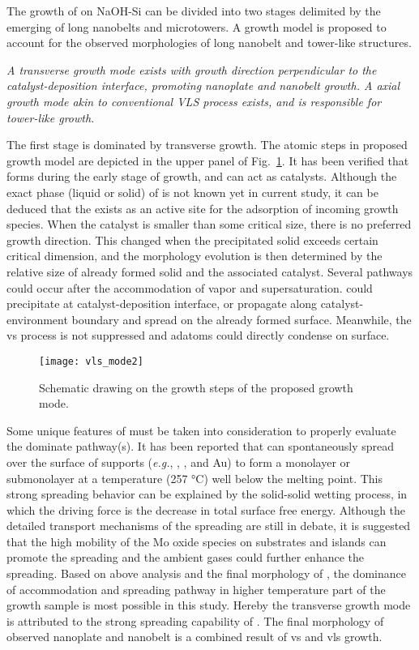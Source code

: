The growth of  on NaOH-Si can be divided into two stages delimited by the emerging of long nanobelts and microtowers. A growth model is proposed to account for the observed morphologies of  long nanobelt and tower-like structures.
 
\emph{
A transverse growth mode exists with growth direction perpendicular to the catalyst-deposition interface, promoting  nanoplate and nanobelt growth. A axial growth mode akin to conventional VLS process exists, and is responsible for  tower-like growth.
}

The first stage is dominated by transverse growth. The atomic steps in proposed growth model are depicted in the upper panel of Fig.~\ref{fig:ch4vls}. It has been verified that  forms during the early stage of growth, and can act as catalysts. Although the exact phase (liquid or solid) of  is not known yet in current study, it can be deduced that the  exists as an active site for the adsorption of incoming  growth species. When the catalyst is smaller than some critical size, there is no preferred growth direction. This changed when the precipitated solid exceeds certain critical dimension, and the morphology evolution is then determined by the relative size of already formed solid and the associated catalyst. Several pathways could occur after the accommodation of  vapor and supersaturation.  could precipitate at catalyst-deposition interface, or propagate along catalyst-environment boundary and spread on the already formed  surface. Meanwhile, the \gls{vs} process is not suppressed and  adatoms could directly condense on  surface.

\begin{figure}[htb]
\centering
\texttt{[image: vls\_mode2]}
\caption{Schematic drawing on the growth steps of the proposed growth mode.}
\label{fig:ch4vls}
\end{figure}

Some unique features of  must be taken into consideration to properly evaluate the dominate pathway(s). It has been reported that  can spontaneously spread over the surface of supports (\emph{e.g.}, , , and Au) to form a monolayer or submonolayer at a temperature (257 \si{\degreeCelsius}) well below the melting point.\cite{Leyrer1990} This strong spreading behavior can be explained by the solid-solid wetting process, in which the driving force is the decrease in total surface free energy.\cite{Leyrer1988} Although the detailed transport mechanisms of the spreading are still in debate, it is suggested that the high mobility of the Mo oxide species on substrates and  islands can promote the spreading and the ambient gases could further enhance the spreading.\cite{Gunther2000, Song2003} Based on above analysis and the final morphology of , the dominance of accommodation and spreading pathway in higher temperature part of the growth sample is most possible in this study. Hereby the transverse growth mode is attributed to the strong spreading capability of . The final morphology of observed nanoplate and nanobelt is a combined result of \gls{vs} and \gls{vls} growth. 

